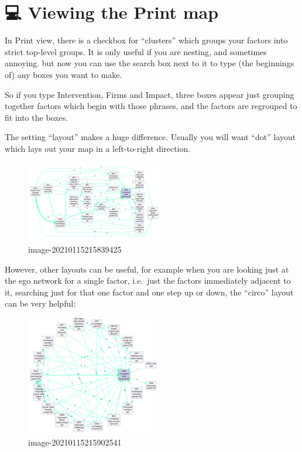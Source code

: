 \documentclass[
]{book}
\begin{document}
\hypertarget{viewing-the-print-map}{%
\section{💻 Viewing the Print map}\label{viewing-the-print-map}}

In Print view, there is a checkbox for ``clusters'' which groups your factors into strict top-level groups. It is only useful if you are nesting, and sometimes annoying. but now you can use the search box next to it to type (the beginnings of) any boxes you want to make.

So if you type Intervention, Firms and Impact, three boxes appear just grouping together factors which begin with those phrases, and the factors are regrouped to fit into the boxes.

The setting ``layout'' makes a huge difference. Usually you will want ``dot'' layout which lays out your map in a left-to-right direction.

\begin{figure}
\centering
\includegraphics{_assets/image-20210115215839425.png}
\caption{image-20210115215839425}
\end{figure}

However, other layouts can be useful, for example when you are looking just at the ego network for a single factor, i.e.~just the factors immediately adjacent to it, searching just for that one factor and one step up or down, the ``circo'' layout can be very helpful:

\begin{figure}
\centering
\includegraphics{_assets/image-20210115215902541.png}
\caption{image-20210115215902541}
\end{figure}
\end{document}
